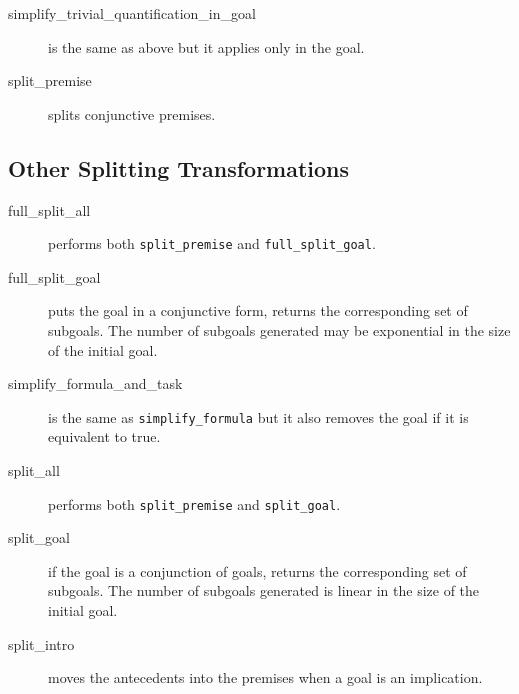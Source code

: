 \begin{description}
\item[simplify\_trivial\_quantification\_in\_goal]
  is the same as above but it applies only in the goal.

\item[split\_premise]
  splits conjunctive premises.

\end{description}

\subsection{Other Splitting Transformations}

\begin{description}

\item[full\_split\_all]
  performs both \texttt{split\_premise} and \texttt{full\_split\_goal}.

\item[full\_split\_goal] puts the goal in a conjunctive form,
  returns the corresponding set of subgoals. The number of subgoals
  generated may be exponential in the size of the initial goal.

\item[simplify\_formula\_and\_task] is the same as \texttt{simplify\_formula}
  but it also removes the goal if it is equivalent to true.

\item[split\_all]
  performs both \texttt{split\_premise} and \texttt{split\_goal}.

\item[split\_goal] if the goal is a conjunction of goals, returns the
  corresponding set of subgoals. The number of subgoals generated is linear in
  the size of the initial goal.

\item[split\_intro]
  moves the antecedents into the premises when a goal is an implication.

\end{description}



